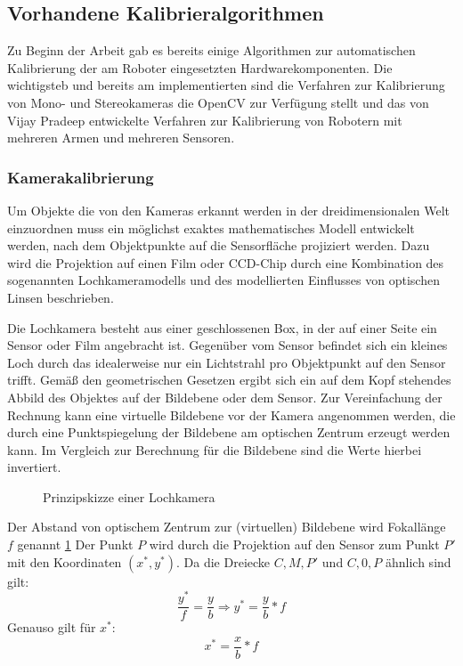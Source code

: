 \subsection{Vorhandene Kalibrieralgorithmen} %
\label{sub:Kalibrieralgorithmen}
Zu Beginn der Arbeit gab es bereits einige Algorithmen zur automatischen
Kalibrierung der am Roboter eingesetzten Hardwarekomponenten. Die wichtigsteb
und bereits am \cob implementierten sind die Verfahren zur Kalibrierung von Mono- 
und Stereokameras die OpenCV zur Verfügung stellt und das von Vijay Pradeep
entwickelte Verfahren zur Kalibrierung von Robotern mit mehreren Armen und 
mehreren Sensoren.


\subsubsection{Kamerakalibrierung} %
\label{ssub:Kamerakalibrierung}
Um Objekte die von den Kameras erkannt werden in der dreidimensionalen Welt
einzuordnen muss ein möglichst exaktes mathematisches Modell entwickelt werden,
nach dem Objektpunkte auf die Sensorfläche projiziert werden. Dazu wird die
Projektion auf einen Film oder \ac{CCD}-Chip durch eine Kombination des sogenannten Lochkameramodells und des
modellierten Einflusses von optischen Linsen beschrieben.

Die Lochkamera besteht aus einer geschlossenen Box, in der auf einer Seite
ein Sensor oder Film angebracht ist. Gegenüber vom Sensor befindet sich ein
kleines Loch durch das idealerweise nur ein Lichtstrahl pro Objektpunkt auf
den Sensor trifft. Gemäß den geometrischen Gesetzen ergibt sich ein auf dem 
Kopf stehendes Abbild des Objektes auf der Bildebene oder dem Sensor. Zur 
Vereinfachung der Rechnung kann eine virtuelle Bildebene vor der Kamera 
angenommen werden, die durch eine Punktspiegelung der Bildebene am optischen
Zentrum erzeugt werden kann. Im Vergleich zur Berechnung für die Bildebene
sind die Werte hierbei invertiert.
\begin{figure}[htpb]
  \centering
  \def\svgwidth{\textwidth}
  
  \caption{Prinzipskizze einer Lochkamera}
  \label{fig:Lochkamera}
\end{figure}
Der Abstand von optischem Zentrum zur (virtuellen) Bildebene wird Fokallänge
$f$ genannt \ref{fig:Lochkamera}  Der Punkt $P$ wird durch die Projektion auf den Sensor zum Punkt $P'$
mit den Koordinaten $(x^*,y^*)$. Da die Dreiecke $C,M,P'$ und $C,0,P$ ähnlich sind gilt:
\begin{equation}
  \frac{y^*}{f}=\frac{y}{b} \Rightarrow y^*=\frac{y}{b}*f
\end{equation}
Genauso gilt für $x^*$:
\begin{equation}
  x^*=\frac{x}{b}*f
\end{equation}

